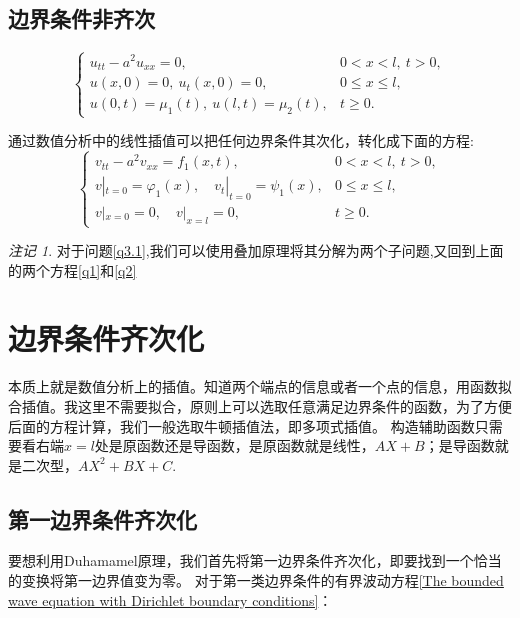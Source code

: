 \documentclass[12pt,a4paper]{article}
\numberwithin{subsection}{section}   %
\numberwithin{subsubsection}{subsection}
\theoremstyle{plain}
\theoremstyle{definition}
\theoremstyle{remark}
\newtheorem{remark}[theorem]{注记}
\theoremstyle{remark}
\begin{document}
	
	\subsection{边界条件非齐次}
	\begin{equation}\label{q3}
		\begin{cases}
			u_{tt} - a^2 u_{xx} = 0, & 0 < x < l, \ t > 0, \\
			u(x, 0) = 0, \ u_t(x, 0) = 0, & 0 \leq x \leq l, \\
			u(0, t) = \mu_1(t), \ u(l, t) = \mu_2(t), & t \geq 0.
		\end{cases}
	\end{equation}	
	
	通过数值分析中的线性插值可以把任何边界条件其次化，转化成下面的方程:
	\begin{equation}\label{q3.1}
	\begin{cases}
		v_{tt} - a^2 v_{xx} = f_1(x, t), & 0 < x < l, \ t > 0, \\
		v|_{t=0} = \varphi_1(x), \quad v_t|_{t=0} = \psi_1(x), & 0 \leq x \leq l, \\
		v|_{x=0} = 0, \quad v|_{x=l} = 0, & t \geq 0.
	\end{cases}
\end{equation}
	
	
	\begin{remark}
	对于问题\eqref{q3.1},我们可以使用叠加原理将其分解为两个子问题,又回到上面的两个方程\eqref{q1}和\eqref{q2}
\end{remark}

	

	
	\newpage
	
		\section{边界条件齐次化}
		本质上就是数值分析上的插值。知道两个端点的信息或者一个点的信息，用函数拟合插值。我这里不需要拟合，原则上可以选取任意满足边界条件的函数，为了方便后面的方程计算，我们一般选取牛顿插值法，即多项式插值。	构造辅助函数只需要看右端$x=l$处是原函数还是导函数，是原函数就是线性，$AX+B$；是导函数就是二次型，$AX^2+BX+C$.
	\subsection{第一边界条件齐次化}
	要想利用Duhamamel原理，我们首先将第一边界条件齐次化，即要找到一个恰当的变换将第一边界值变为零。
	对于第一类边界条件的有界波动方程\eqref{The bounded wave equation with Dirichlet boundary conditions}：
	
\end{document}
